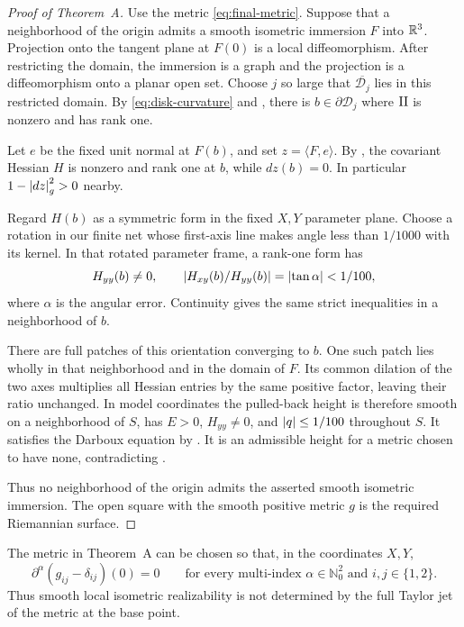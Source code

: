 \begin{proof}[Proof of Theorem~A]
Use the metric \eqref{eq:final-metric}.
Suppose that a neighborhood of the origin admits a smooth
isometric immersion \(F\) into \(\mathbb R^3\).
Projection onto the tangent plane at \(F(0)\) is a local
diffeomorphism. After restricting the domain, the immersion
is a graph and the projection is a diffeomorphism onto a
planar open set. Choose \(j\) so large that
\(\overline{\mathcal D_j}\) lies in this restricted domain.
By \eqref{eq:disk-curvature} and , there is
\(b\in\partial\mathcal D_j\) where \(\mathrm{II}\) is nonzero and
has rank one.

Let \(e\) be the fixed unit normal at \(F(b)\), and set
\(z=\langle F,e\rangle\). By , the covariant
Hessian \(H\) is nonzero and rank one at \(b\), while \(dz(b)=0\).
In particular \(1-\left\lvert dz\right\rvert_g^2>0\) nearby.

Regard \(H(b)\) as a symmetric form in the fixed \(X,Y\)
parameter plane. Choose a rotation in our finite net whose
first-axis line makes angle less than \(1/1000\) with its
kernel. In that rotated parameter frame, a rank-one form
has
\[
H_{yy}(b)\ne0,\qquad
\left\lvert H_{xy}(b)/H_{yy}(b)\right\rvert
=\left\lvert\tan\alpha\right\rvert<1/100,
\]
where \(\alpha\) is the angular error.
Continuity gives the same strict inequalities in a
neighborhood of \(b\).

There are full patches of this orientation converging to \(b\).
One such patch lies wholly in that neighborhood and in the
domain of \(F\). Its common dilation of the two axes multiplies
all Hessian entries by the same positive factor, leaving their
ratio unchanged. In model coordinates the pulled-back height
is therefore smooth on a neighborhood of \(S\), has \(E>0\),
\(H_{yy}\ne0\), and \(\left\lvert q\right\rvert\le1/100\) throughout \(S\).
It satisfies the Darboux equation by .
It is an admissible height for a metric chosen to have none,
contradicting .

Thus no neighborhood of the origin admits the asserted smooth
isometric immersion. The open square with the smooth positive
metric \(g\) is the required Riemannian surface.
\end{proof}

\begin{corollary}\label{cor:flat-jet}
The metric in Theorem~A can be chosen so that, in the coordinates
\(X,Y\),
\[
\partial^\alpha(g_{ij}-\delta_{ij})(0)=0
\qquad
\text{for every multi-index }\alpha\in\mathbb N_0^2
\text{ and }i,j\in\{1,2\}.
\]
Thus smooth local isometric realizability is not determined by
the full Taylor jet of the metric at the base point.
\end{corollary}

